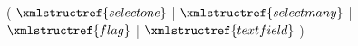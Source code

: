 ( $\xmlstructref{selectone}$ | $\xmlstructref{selectmany}$ | $\xmlstructref{flag}$ | $\xmlstructref{textfield}$ )


